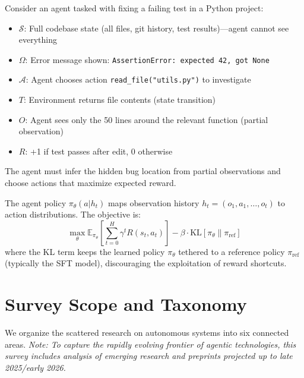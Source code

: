 \documentclass[12pt,a4paper]{report}
\theoremstyle{definition}
\begin{document}
\begin{tcolorbox}[colback=gray!5!white, colframe=gray!60!black, title=\textbf{Concrete Example: Bug-Fixing Agent as POMDP}]
\small
Consider an agent tasked with fixing a failing test in a Python project:
\begin{itemize}
    \item $\mathcal{S}$: Full codebase state (all files, git history, test results)---agent cannot see everything
    \item $\Omega$: Error message shown: \texttt{AssertionError: expected 42, got None}
    \item $\mathcal{A}$: Agent chooses action \texttt{read\_file("utils.py")} to investigate
    \item $T$: Environment returns file contents (state transition)
    \item $O$: Agent sees only the 50 lines around the relevant function (partial observation)
    \item $R$: +1 if test passes after edit, 0 otherwise
\end{itemize}
The agent must infer the hidden bug location from partial observations and choose actions that maximize expected reward.
\end{tcolorbox}

The agent policy $\pi_\theta(a|h_t)$ maps observation history $h_t = (o_1, a_1, \ldots, o_t)$ to action distributions. The objective is:
\begin{equation}
\max_\theta \mathbb{E}_{\pi_\theta} \left[ \sum_{t=0}^{H} \gamma^t R(s_t, a_t) \right] - \beta \cdot \text{KL}[\pi_\theta \| \pi_{\text{ref}}]
\label{eq:objective}
\end{equation}
where the KL term keeps the learned policy $\pi_\theta$ tethered to a reference policy $\pi_{\text{ref}}$ (typically the SFT model), discouraging the exploitation of reward shortcuts.

\section{Survey Scope and Taxonomy}
We organize the scattered research on autonomous systems into six connected areas. \textit{Note: To capture the rapidly evolving frontier of agentic technologies, this survey includes analysis of emerging research and preprints projected up to late 2025/early 2026.}
\end{document}
